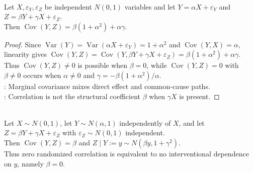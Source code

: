\begin{proposition} \label{prop:gaussian-confounding-correlation-can-mislead} \\
Let $X,\varepsilon_Y,\varepsilon_Z$ be independent $N(0,1)$ variables and let $Y=\alpha X+\varepsilon_Y$ and $Z=\beta Y+\gamma X+\varepsilon_Z$.\\
Then $\operatorname{Cov}(Y,Z)=\beta(1+\alpha^2)+\alpha\gamma$.
\begin{proof}
Since $\operatorname{Var}(Y)=\operatorname{Var}(\alpha X+\varepsilon_Y)=1+\alpha^2$ and $\operatorname{Cov}(Y,X)=\alpha$,\\
linearity gives $\operatorname{Cov}(Y,Z)=\operatorname{Cov}(Y,\beta Y+\gamma X+\varepsilon_Z)=\beta(1+\alpha^2)+\alpha\gamma$.
Thus $\operatorname{Cov}(Y,Z)\neq0$ is possible when $\beta=0$, while $\operatorname{Cov}(Y,Z)=0$ with $\beta\neq0$ occurs when $\alpha\neq0$ and $\gamma=-\beta(1+\alpha^2)/\alpha$.\\
: Marginal covariance mixes direct effect and common-cause paths.\\
: Correlation is not the structural coefficient $\beta$ when $\gamma X$ is present.
\end{proof}
\end{proposition}

\begin{example} \label{ex:randomized-gaussian-corrects-correlation-reading} \\
Let $X\sim N(0,1)$, let $Y\sim N(\alpha,1)$ independently of $X$, and let $Z=\beta Y+\gamma X+\varepsilon_Z$ with $\varepsilon_Z\sim N(0,1)$ independent.\\
Then $\operatorname{Cov}(Y,Z)=\beta$ and $Z\mid Y:=y\sim N(\beta y,1+\gamma^2)$.\\
Thus zero randomized correlation is equivalent to no interventional dependence on $y$, namely $\beta=0$.
\end{example}
